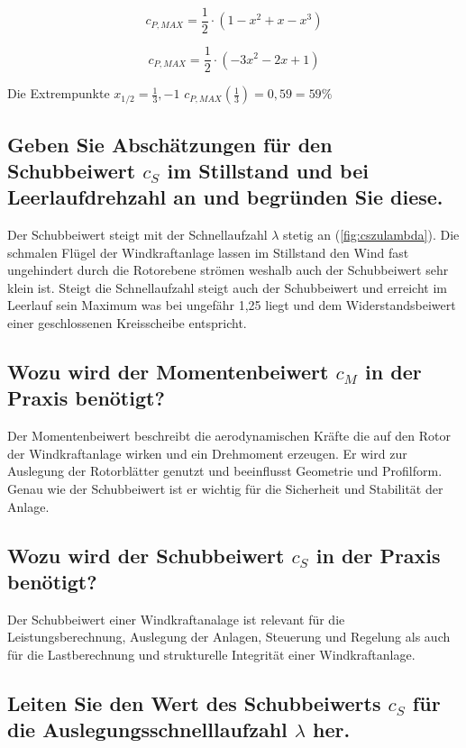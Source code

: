 \begin{equation}
c_{P,MAX}= \frac{1}{2} \cdot (1-x^2+x-x^3)
\label{eq:CPMAX}
\end{equation}

\begin{equation}
c_{P,MAX}=\frac{1}{2} \cdot (-3x^2-2x+1)
\label{eq:CPMAX2}
\end{equation}
 
Die Extrempunkte  $x_{1/2}= \frac{1}{3}, -1$
$c_{P,MAX}(\frac{1}{3})=0,59 = 59\%$

\subsection{Geben Sie Abschätzungen für den Schubbeiwert \texorpdfstring{$c_S$}{} im Stillstand und bei
Leerlaufdrehzahl an und begründen Sie diese.}

Der Schubbeiwert steigt mit der Schnellaufzahl $\lambda$ stetig an (\ref{fig:cszulambda}). Die schmalen Flügel der Windkraftanlage lassen im Stillstand den Wind fast ungehindert durch die Rotorebene strömen weshalb auch der Schubbeiwert sehr klein ist. Steigt die Schnellaufzahl steigt auch der Schubbeiwert und erreicht im Leerlauf sein Maximum was bei ungefähr 1,25 liegt und dem Widerstandsbeiwert einer geschlossenen Kreisscheibe entspricht. 


\subsection{Wozu wird der Momentenbeiwert \texorpdfstring{$c_M$}{} in der Praxis benötigt?}

Der Momentenbeiwert beschreibt die aerodynamischen Kräfte die auf den Rotor der Windkraftanlage wirken und ein Drehmoment erzeugen. Er wird zur Auslegung der Rotorblätter genutzt und beeinflusst Geometrie und Profilform. Genau wie der Schubbeiwert ist er wichtig für die Sicherheit und Stabilität der Anlage. 


\subsection{Wozu wird der Schubbeiwert \texorpdfstring{$c_S$}{} in der Praxis benötigt?}

Der Schubbeiwert einer Windkraftanalage ist relevant für die Leistungsberechnung, Auslegung der Anlagen, Steuerung und Regelung als auch für die Lastberechnung und strukturelle Integrität einer Windkraftanlage. 

\subsection{Leiten Sie den Wert des Schubbeiwerts \texorpdfstring{$c_S$}{} für die Auslegungsschnelllaufzahl \texorpdfstring{$\lambda$}{}
her.}

